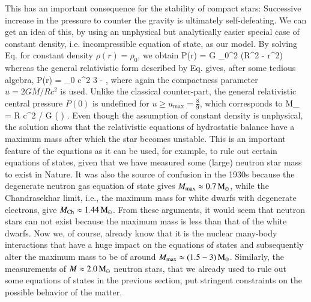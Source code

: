 This has an important consequence for the stability of compact stars:
Successive increase in the pressure to counter the gravity is ultimately self-defeating.
We can get an idea of this, by using an unphysical but analytically easier special case of constant density, i.e. incompressible equation of state, as our model.
By solving Eq. for constant density $\rho(r) = \rho_0$, we obtain
\be
P(r) = G  \rho_0^2 (R^2 - r^2)
\ee
whereas the general relativistic form described by Eq. gives, after some tedious algebra,
\be
P(r) = \rho_0 c^2  
                          { 3 -  },
\ee
where again the compactness parameter $u = 2GM/Rc^2$ is used.
Unlike the classical counter-part, the general relativistic central pressure $P(0)$ is undefined for $u \ge u_{\mathrm{max}}=\frac{8}{9}$, which corresponds to
\be
M_{} =  R c^2 / G  \left(  \right) \Msun.
\ee
Even though the assumption of constant density is unphysical, the solution shows that the relativistic equations of hydrostatic balance have a maximum mass after which the star becomes unstable.
This is an important feature of the equations as it can be used, for example, to rule out certain equations of states, given that we have measured some (large) neutron star mass to exist in Nature.
It was also the source of confusion in the 1930s because the degenerate neutron gas equation of state gives $M_{\mathrm{max}} \approx 0.7 \, \mathrm{M}_{\odot}$, while the Chandrasekhar limit, i.e., the maximum mass for white dwarfs with degenerate electrons, give $M_{\mathrm{Ch}} \approx 1.44 \, \mathrm{M}_{\odot}$.
From these arguments, it would seem that neutron stars can not exist because the maximum mass is less than that of the white dwarfs.
Now we, of course, already know that it is the nuclear many-body interactions that have a huge impact on the equations of states and subsequently alter the maximum mass to be of around $M_{\mathrm{max}} \approx (1.5-3) \, \mathrm{M}_{\odot}$.
Similarly, the measurements of $M \approx 2.0\, \mathrm{M}_{\odot}$ neutron stars, that we already used to rule out some equations of states in the previous section, put stringent constraints on the possible behavior of the matter.



